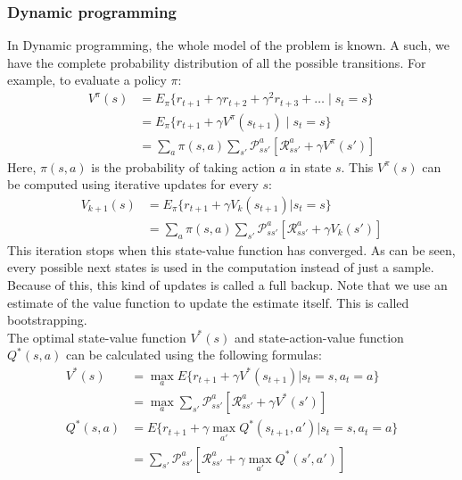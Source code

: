 \documentclass[a4paper]{article}
\begin{document}
\subsubsection{Dynamic programming}
In Dynamic programming, the whole model of the problem is known. A such, we have the complete probability distribution of all the possible transitions. For example, to evaluate a policy $\pi$:
\begin{align}
V^{\pi}(s) &= E_{\pi} \{r_{t+1} + \gamma r_{t+2} + \gamma^2r_{t+3}+\dots \mid s_t=s\}\\
&= E_{\pi} \{r_{t+1} + \gamma V^{\pi}(s_{t+1}) \mid s_t=s\}\\
&= \sum_a \pi(s,a) \sum_{s'} \mathcal{P}^a_{ss'} [\mathcal{R}^a_{ss'} + \gamma V^{\pi}(s')]
\end{align}
Here, $\pi(s,a)$ is the probability of taking action $a$ in state $s$. This $V^{\pi}(s)$ can be computed using iterative updates for every $s$:
\begin{align}
V_{k+1}(s) &= E_{\pi}\{r_{t+1} + \gamma V_k(s_{t+1}) \vert s_t=s\}\\
&= \sum_a \pi(s,a) \sum_{s'}\mathcal{P}^a_{ss'} [\mathcal{R}^a_{ss'} + \gamma V_k(s')]
\end{align}
This iteration stops when this state-value function has converged. As can be seen, every possible next states is used in the computation instead of just a sample. Because of this, this kind of updates is called a full backup.
Note that we use an estimate of the value function to update the estimate itself. This is called bootstrapping.\\
The optimal state-value function $V^*(s)$ and state-action-value function $Q^*(s,a)$ can be calculated using the following formulas:
\begin{align}
V^{*}(s) &= \max_a E\{r_{t+1} + \gamma V^{*}(s_{t+1}) \vert s_t = s, a_t = a\}\\
&= \max_a \sum_{s'} \mathcal{P}^a_{ss'} [\mathcal{R}^a_{ss'}+\gamma V^{*}(s')]\\
Q^{*}(s,a) &= E\{r_{t+1} + \gamma \max_{a'} Q^{*}(s_{t+1},a') \vert s_t=s, a_t=a\}\\
&= \sum_{s'} \mathcal{P}^a_{ss'} [\mathcal{R}^a_{ss'}+\gamma \max_{a'} Q^{*}(s',a')]
\end{align}
\end{document}
